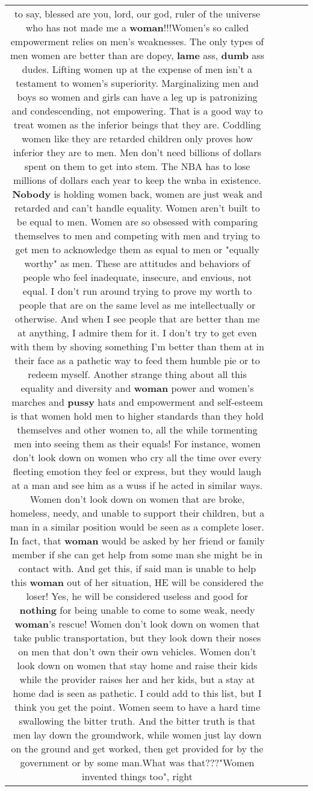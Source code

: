 \documentclass[11pt]{article}
\newlength\mylength
\begin{document}
\begin{center}
\begin{longtable}{|C{.65\mylength}|C{.30\mylength}|C{.12\mylength}|C{.12\mylength}|C{.12\mylength}|}
to say, blessed are you, lord, our god, ruler of the universe who has not made me a \textbf{woman}!!!Women's so called empowerment relies on men's weaknesses. The only types of men women are better than are dopey, \textbf{lame} ass, \textbf{dumb} ass dudes. Lifting women up at the expense of men isn't a testament to women's superiority. Marginalizing men and boys so women and girls can have a leg up is patronizing and condescending, not empowering. That is a good way to treat women as the inferior beings that they are. Coddling women like they are retarded children only proves how inferior they are to men. Men don't need billions of dollars spent on them to get into stem. The NBA has to lose millions of dollars each year to keep the wnba in existence. \textbf{Nobody} is holding women back, women are just weak and retarded and can't handle equality. Women aren't built to be equal to men. Women are so obsessed with comparing themselves to men and competing with men and trying to get men to acknowledge them as equal to men or "equally worthy" as men. These are attitudes and behaviors of people who feel inadequate, insecure, and envious, not equal. I don't run around trying to prove my worth to people that are on the same level as me intellectually or otherwise. And when I see people that are better than me at anything, I admire them for it. I don't try to get even with them by shoving something I'm better than them at in their face as a pathetic way to feed them humble pie or to redeem myself. Another strange thing about all this equality and diversity and \textbf{woman} power and women's marches and \textbf{pussy} hats and empowerment and self-esteem is that women hold men to higher standards than they hold themselves and other women to, all the while tormenting men into seeing them as their equals! For instance, women don't look down on women who cry all the time over every fleeting emotion they feel or express, but they would laugh at a man and see him as a wuss if he acted in similar ways. Women don't look down on women that are broke, homeless, needy, and unable to support their children, but a man in a similar position would be seen as a complete loser. In fact, that \textbf{woman} would be asked by her friend or family member if she can get help from some man she might be in contact with. And get this, if said man is unable to help this \textbf{woman} out of her situation, HE will be considered the loser! Yes, he will be considered useless and good for \textbf{nothing} for being unable to come to some weak, needy \textbf{woman}'s rescue! Women don't look down on women that take public transportation, but they look down their noses on men that don't own their own vehicles. Women don't look down on women that stay home and raise their kids while the provider raises her and her kids, but a stay at home dad is seen as pathetic. I could add to this list, but I think you get the point. Women seem to have a hard time swallowing the bitter truth. And the bitter truth is that men lay down the groundwork, while women just lay down on the ground and get worked, then get provided for by the government or by some man.What was that???"Women invented things too", right 
\end{longtable}
\end{center}
\end{document}

